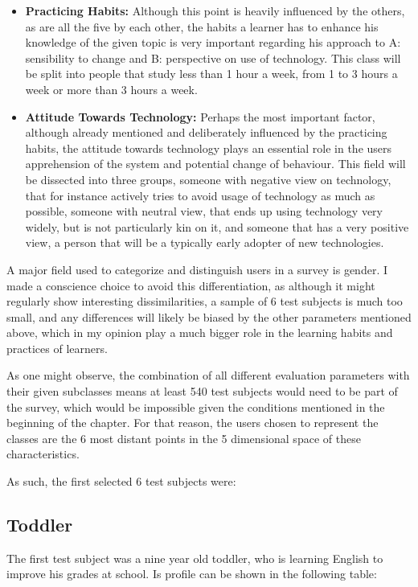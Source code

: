 \begin{itemize}
    \item \textbf{Practicing Habits: }
	Although this point is heavily influenced by the others, as are all 
	the five by each other, the habits a learner has to enhance his 
	knowledge of the given topic is very important regarding his approach
	to A: sensibility to change and B: perspective on use of technology.
	This class will be split into people that study less than 1 hour a week,
	from 1 to 3 hours a week or more than 3 hours a week.

    \item \textbf{Attitude Towards Technology: }
	Perhaps the most important factor, although already mentioned and 
	deliberately influenced by the practicing habits, the attitude towards
	technology plays an essential role in the users apprehension of the
	system and potential change of behaviour.  
	This field will be dissected into three groups, someone with negative 
	view on technology, that for instance actively tries to avoid usage 
	of technology as much as possible, someone with neutral view, that ends
	up using technology very widely, but is not particularly kin on it, and
	someone that has a very positive view, a person that will be a typically
	early adopter of new technologies.

\end{itemize}


A major field used to categorize and distinguish users in a survey is gender.
I made a conscience choice to avoid this differentiation, as although it might
regularly show interesting dissimilarities, a sample of 6 test subjects is much
too small, and any differences will likely be biased by the other parameters 
mentioned above, which in my opinion play a much bigger role in the learning 
habits and practices of learners.


As one might observe, the combination of
all different evaluation parameters with their given subclasses means at least
540 test subjects would need to be part of the survey, which would be impossible given the
conditions mentioned in the beginning of the chapter. For that reason, the users
chosen to represent the classes are the 6 most distant points in the 5 
dimensional space of these characteristics.

As such, the first selected 6 test subjects were: 

\subsection{Toddler}
The first test subject was a nine year old toddler, who is learning English to
improve his grades at school. Is profile can be shown in the following table:

